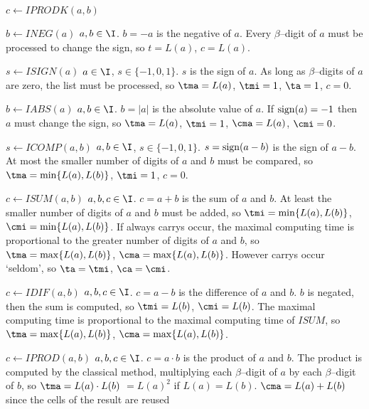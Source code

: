 \begin{deflist}{$c \gets IPRODK(a,b)$}
\item[$b \gets INEG(a)$] $a, b \in \I$. 
     $b = -a$ is the negative of $a$. 
     Every $\beta$--digit of $a$ must be processed
     to change the sign, so
     $t = L(a)$, $c = L(a)$.
\item[$s \gets ISIGN(a)$] $a \in \I$, $s \in \{ -1, 0, 1 \}$. 
     $s$ is the sign of $a$. 
     As long as $\beta$--digits of $a$ are zero, the list must 
     be processed, so
     $\tma = L(a)$, $\tmi = 1$, $\ta = 1$, $c = 0$.
\item[$b \gets IABS(a)$] $a, b \in \I$. 
     $b = \vert a \vert$ is the absolute value of $a$. 
     If ${\rm sign}(a) = -1$ then $a$ must change the sign, so
     $\tma = L(a)$, $\tmi = 1$, $\cma = L(a)$, $\cmi = 0$.
\item[$s \gets ICOMP(a,b)$] $a, b \in \I$, $s \in \{ -1, 0, 1 \}$. 
     $s = {\rm sign}(a-b)$ is the sign of $a-b$. 
     At most the smaller number of digits of $a$ and $b$ must be
     compared, so
     $\tma = {\rm min}\{ L(a), L(b) \}$, 
     $\tmi = 1$, $c = 0$.
\item[$c \gets ISUM(a,b)$] $a, b, c \in \I$.
     $c = a + b$ is the sum of $a$ and $b$. 
     At least the smaller number of digits of $a$ and $b$ must be
     added, so
     $\tmi = {\rm min}\{ L(a), L(b) \}$, 
     $\cmi = {\rm min}\{ L(a), L(b) \}$. 
     If always carrys occur, the maximal computing time is 
     proportional to
     the greater number of digits of $a$ and $b$, so
     $\tma = {\rm max}\{ L(a), L(b) \}$, 
     $\cma = {\rm max}\{ L(a), L(b) \}$. 
     However carrys occur `seldom', so
     $\ta = \tmi$, $\ca = \cmi$. 
\item[$c \gets IDIF(a,b)$] $a, b, c \in \I$.
     $c = a - b$ is the difference of $a$ and $b$. 
     $b$ is negated, then the sum is computed, so
     $\tmi = L(b) $, $\cmi = L(b) $. 
     The maximal computing time is proportional to 
     the maximal computing time of $ISUM$, so 
     $\tma = {\rm max}\{ L(a), L(b) \}$, 
     $\cma = {\rm max}\{ L(a), L(b) \}$. 
\item[$c \gets IPROD(a,b)$] $a, b, c \in \I$.
     $c = a \cdot b$ is the product of $a$ and $b$.
     The product is computed by the classical method, multiplying
     each $\beta$--digit of $a$ by each $\beta$--digit of $b$, so 
     $\tma = L(a) \cdot L(b)$ $= L(a)^2$ if $L(a) = L(b)$.   
     $\cma = L(a) + L(b)$ since the cells of the result are reused

\end{deflist}
